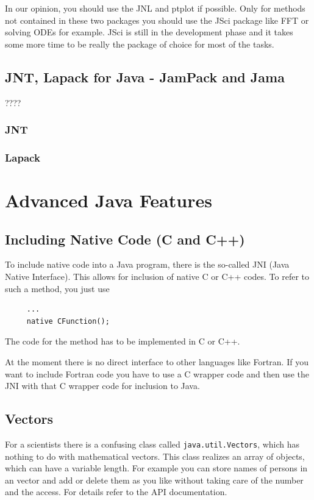 In our opinion, you should use the JNL and ptplot if possible. Only for
methods not contained in these two packages you should use the
JSci package like FFT or solving ODEs for example. JSci is still in
the development phase and it takes some more time to be really
the package of choice for most of the tasks.   

\subsection{JNT, Lapack for Java - JamPack and Jama}
????
\subsubsection{JNT}
\subsubsection{Lapack}


\section{Advanced Java Features}

\subsection{Including Native Code (C and C++)}
To include native code into a Java program, there is the so-called
JNI (Java Native Interface). This allows for inclusion of native
C or C++ codes. To refer to such a method, you just use
\begin{verbatim}
     ...
     native CFunction();
\end{verbatim}
The code for the method has to be implemented in C or C++.

At the moment there is no direct interface to other languages like
Fortran. If you want to include Fortran code you have to use
a C wrapper code and then use the JNI with that C wrapper code
for inclusion to Java.

\subsection{Vectors}
For a scientists there is a confusing class called \verb|java.util.Vectors|, 
which has nothing to do with mathematical vectors. This class realizes
an array of objects, which can have a variable length. For example
you can store names of persons in an vector and add or delete them as
you like without taking care of the number and the access. For details
refer to the API documentation.

